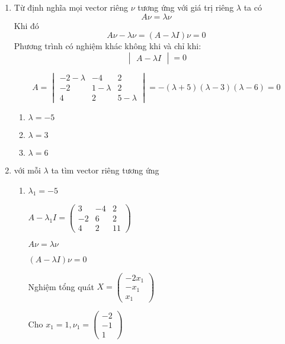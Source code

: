\documentclass[12pt]{article}
\begin{document}
\begin{enumerate}
    \item Từ định nghĩa mọi vector riêng $\nu$ tương ứng với giá trị riêng $\lambda$ ta có
          $$A\nu = \lambda \nu$$
          Khi đó
          $$ A\nu - \lambda \nu = (A-\lambda I )\nu = 0 $$
          Phương trình có nghiệm khác không khi và chỉ khi:
          $$ \begin{vmatrix} A - \lambda I \end{vmatrix} = 0$$

          $$ A = \begin{vmatrix}
                  -2 -\lambda & -4         & 2          \\
                  -2          & 1 -\lambda & 2          \\
                  4           & 2          & 5 -\lambda
              \end{vmatrix} = -(\lambda+5)(\lambda -3)(\lambda-6) = 0 $$

          \begin{enumerate}
              \item $\lambda = -5$
              \item $\lambda = 3$
              \item $\lambda = 6$
          \end{enumerate}
    \item với mỗi $\lambda$ ta tìm vector riêng tương ứng
          \begin{enumerate}
              \item $\lambda_1 = -5$

                    $A-\lambda_1 I = \begin{pmatrix}
                            3  & -4 & 2  \\
                            -2 & 6  & 2  \\
                            4  & 2  & 11
                        \end{pmatrix} $

                    $A\nu = \lambda \nu$

                    $(A-\lambda I )\nu = 0$

                    Nghiệm tổng quát $X= \begin{pmatrix} -2x_1 \\ -x_1 \\ x_1 \end{pmatrix}$

                    Cho $x_1 = 1, \nu_1 = \begin{pmatrix} -2 \\ -1 \\ 1 \end{pmatrix}$


\end{enumerate}
\end{enumerate}
\end{document}
